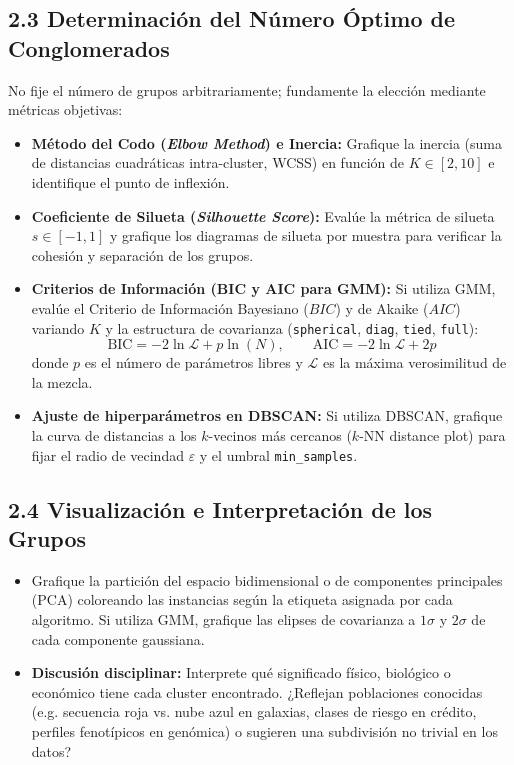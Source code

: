 \documentclass[11pt,a4paper]{article}
\begin{document}
\subsection{2.3 Determinación del Número Óptimo de Conglomerados}
No fije el número de grupos arbitrariamente; fundamente la elección mediante métricas objetivas:
\begin{itemize}[leftmargin=*,itemsep=3pt]
    \item \textbf{Método del Codo (\textit{Elbow Method}) e Inercia:} Grafique la inercia (suma de distancias cuadráticas intra-cluster, WCSS) en función de $K \in [2, 10]$ e identifique el punto de inflexión.
    \item \textbf{Coeficiente de Silueta (\textit{Silhouette Score}):} Evalúe la métrica de silueta $s \in [-1, 1]$ y grafique los diagramas de silueta por muestra para verificar la cohesión y separación de los grupos.
    \item \textbf{Criterios de Información (BIC y AIC para GMM):} Si utiliza GMM, evalúe el Criterio de Información Bayesiano ($BIC$) y de Akaike ($AIC$) variando $K$ y la estructura de covarianza (\texttt{spherical}, \texttt{diag}, \texttt{tied}, \texttt{full}):
    \begin{equation}
        \text{BIC} = -2 \ln \mathcal{L} + p \ln(N), \qquad \text{AIC} = -2 \ln \mathcal{L} + 2p
    \end{equation}
    donde $p$ es el número de parámetros libres y $\mathcal{L}$ es la máxima verosimilitud de la mezcla.
    \item \textbf{Ajuste de hiperparámetros en DBSCAN:} Si utiliza DBSCAN, grafique la curva de distancias a los $k$-vecinos más cercanos ($k$-NN distance plot) para fijar el radio de vecindad $\varepsilon$ y el umbral \texttt{min\_samples}.
\end{itemize}

\subsection{2.4 Visualización e Interpretación de los Grupos}
\begin{itemize}[leftmargin=*,itemsep=2pt]
    \item Grafique la partición del espacio bidimensional o de componentes principales (PCA) coloreando las instancias según la etiqueta asignada por cada algoritmo. Si utiliza GMM, grafique las elipses de covarianza a $1\sigma$ y $2\sigma$ de cada componente gaussiana.
    \item \textbf{Discusión disciplinar:} Interprete qué significado físico, biológico o económico tiene cada cluster encontrado. ¿Reflejan poblaciones conocidas (e.g. secuencia roja vs. nube azul en galaxias, clases de riesgo en crédito, perfiles fenotípicos en genómica) o sugieren una subdivisión no trivial en los datos?
\end{itemize}
\end{document}
